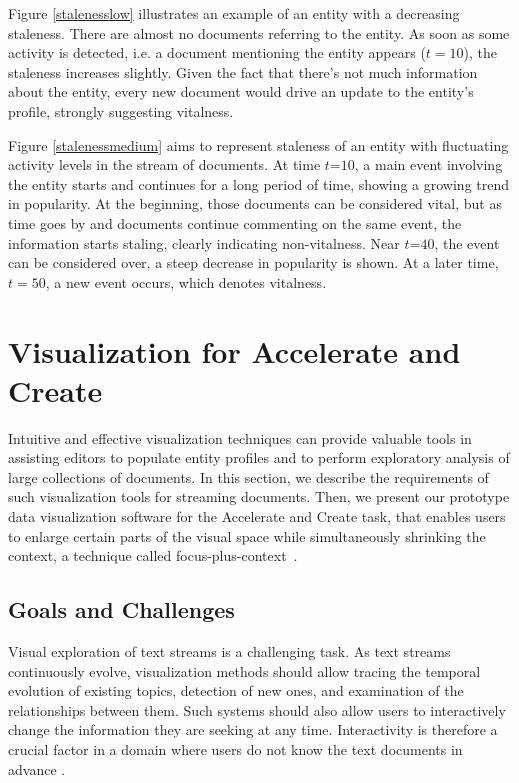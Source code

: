 \documentclass{article}
\begin{document}
Figure \ref{stalenesslow} illustrates an example of an entity with a decreasing staleness. 
There are almost no documents referring to the entity. 
As soon as some activity is detected, i.e. a document mentioning the entity appears ($t=10$), the staleness increases slightly. 
Given the fact that there's not much information about the entity, every new document would drive an update to the entity's profile, strongly suggesting vitalness.

Figure \ref{stalenessmedium} aims to represent staleness of an entity with fluctuating activity levels in the stream of documents. At time $t\mathord{=}10$, a main event involving the entity starts and continues for a long period of time, showing a growing trend in popularity. 
At the beginning, those documents can be considered vital, but as time goes by and documents continue commenting on the same event, the information starts staling, clearly indicating non-vitalness.
Near $t\mathord{=}40$, the event can be considered over, a steep decrease in popularity is shown. At a later time, $t=50$, a new event occurs, which denotes vitalness.

\section{Visualization for Accelerate and Create}

Intuitive and effective visualization techniques can provide valuable tools in assisting editors to populate entity profiles and to perform exploratory analysis of large collections of documents. 
In this section, we describe the requirements of such visualization tools for streaming documents.
Then, we present our prototype data visualization software for the Accelerate and Create task, that enables users to enlarge certain parts of the visual space while simultaneously shrinking the context, a technique called focus-plus-context~\cite{Artur2010}.

\subsection{Goals and Challenges}

Visual exploration of text streams is a challenging task. As text streams continuously evolve, visualization methods should allow tracing the temporal evolution of existing topics, detection of new ones, and examination of the relationships between them.
Such systems should also allow users to interactively change the information they are seeking at any time. 
Interactivity is therefore a crucial factor in a domain where users do not know the text documents in advance \cite{AlsakranCLZYDL12}.
\end{document}
